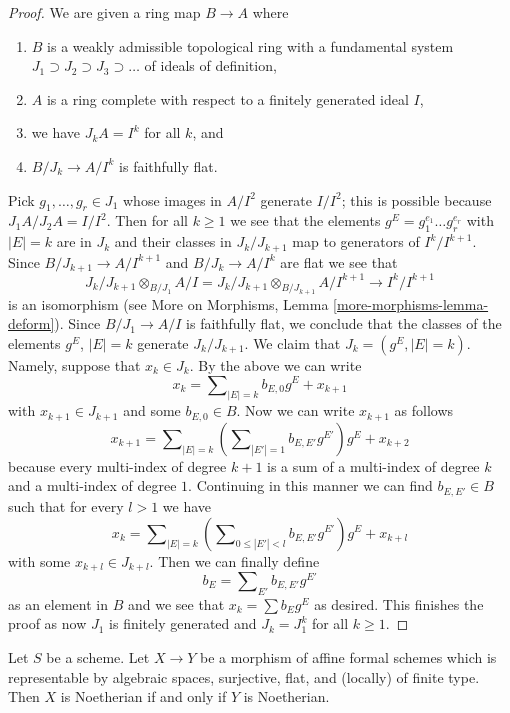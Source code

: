 \begin{proof}
\medskip\noindent
We are given a ring map $B \to A$ where
\begin{enumerate}
\item $B$ is a weakly admissible topological ring with a fundamental system
$J_1 \supset J_2 \supset J_3 \supset \ldots$ of ideals of definition,
\item $A$ is a ring complete with respect to a finitely generated
ideal $I$,
\item we have $J_k A = I^k$ for all $k$, and
\item $B/J_k \to A/I^k$ is faithfully flat.
\end{enumerate}
Pick $g_1, \ldots, g_r \in J_1$
whose images in $A/I^2$ generate $I/I^2$; this is possible because
$J_1A/J_2A = I/I^2$. Then for all $k \geq 1$ we see that the elements
$g^E = g_1^{e_1} \ldots g_r^{e_r}$ with $|E| = k$ are in $J_k$
and their classes in $J_k/J_{k + 1}$ map to generators of
$I^k/I^{k + 1}$. Since $B/J_{k + 1} \to A/I^{k + 1}$
and $B/J_k \to A/I^k$ are flat we see that
$$
J_k/J_{k + 1} \otimes_{B/J_1} A/I =
J_k/J_{k + 1} \otimes_{B/J_{k + 1}} A/I^{k + 1} \to I^k/I^{k + 1}
$$
is an isomorphism (see More on Morphisms, Lemma
\ref{more-morphisms-lemma-deform}). Since $B/J_1 \to A/I$ is
faithfully flat, we conclude that the classes of the elements
$g^E$, $|E| = k$ generate $J_k/J_{k + 1}$. We claim that
$J_k = (g^E, |E| = k)$. Namely, suppose that $x_k \in J_k$.
By the above we can write
$$
x_k = \sum\nolimits_{|E| = k} b_{E, 0} g^E + x_{k + 1}
$$
with $x_{k + 1} \in J_{k + 1}$ and some $b_{E, 0} \in B$. Now we can write
$x_{k + 1}$ as follows
$$
x_{k + 1} =
\sum\nolimits_{|E| = k}
\left(\sum\nolimits_{|E'| = 1} b_{E, E'}g^{E'}\right) g^E + x_{k + 2}
$$
because every multi-index of degree $k + 1$ is a sum of a multi-index
of degree $k$ and a multi-index of degree $1$. Continuing in this
manner we can find $b_{E, E'} \in B$ such that for every $l > 1$
we have
$$
x_k = \sum\nolimits_{|E| = k}
\left(\sum\nolimits_{0 \leq |E'| < l} b_{E, E'} g^{E'}\right) g^E + x_{k + l}
$$
with some $x_{k + l} \in J_{k + l}$. Then we can finally define
$$
b_E = \sum\nolimits_{E'} b_{E, E'} g^{E'}
$$
as an element in $B$ and we see that $x_k = \sum b_E g^E$ as desired.
This finishes the proof as now $J_1$ is finitely generated and $J_k = J_1^k$
for all $k \geq 1$.
\end{proof}

\begin{lemma}
\label{lemma-iff-noetherian}
Let $S$ be a scheme. Let $X \to Y$ be a morphism of affine
formal schemes which is representable by algebraic spaces,
surjective, flat, and (locally) of finite type. Then $X$ is Noetherian
if and only if $Y$ is Noetherian.
\end{lemma}

